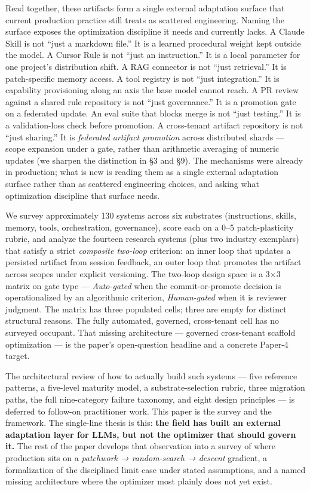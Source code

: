 \documentclass[
]{article}
\begin{document}
Read together, these artifacts form a single external adaptation surface
that current production practice still treats as scattered engineering.
Naming the surface exposes the optimization discipline it needs and
currently lacks. A Claude Skill is not ``just a markdown file.'' It is a
learned procedural weight kept outside the model. A Cursor Rule is not
``just an instruction.'' It is a local parameter for one project's
distribution shift. A RAG connector is not ``just retrieval.'' It is
patch-specific memory access. A tool registry is not ``just
integration.'' It is capability provisioning along an axis the base
model cannot reach. A PR review against a shared rule repository is not
``just governance.'' It is a promotion gate on a federated update. An
eval suite that blocks merge is not ``just testing.'' It is a
validation-loss check before promotion. A cross-tenant artifact
repository is not ``just sharing.'' It is \emph{federated artifact
promotion} across distributed shards --- scope expansion under a gate,
rather than arithmetic averaging of numeric updates (we sharpen the
distinction in §3 and §9). The mechanisms were already in production;
what is new is reading them as a single external adaptation surface
rather than as scattered engineering choices, and asking what
optimization discipline that surface needs.

We survey approximately 130 systems across six substrates (instructions,
skills, memory, tools, orchestration, governance), score each on a 0--5
patch-plasticity rubric, and analyze the fourteen research systems (plus
two industry exemplars) that satisfy a strict \emph{composite two-loop}
criterion: an inner loop that updates a persisted artifact from session
feedback, an outer loop that promotes the artifact across scopes under
explicit versioning. The two-loop design space is a 3×3 matrix on gate
type --- \emph{Auto-gated} when the commit-or-promote decision is
operationalized by an algorithmic criterion, \emph{Human-gated} when it
is reviewer judgment. The matrix has three populated cells; three are
empty for distinct structural reasons. The fully automated, governed,
cross-tenant cell has no surveyed occupant. That missing architecture
--- governed cross-tenant scaffold optimization --- is the paper's
open-question headline and a concrete Paper-4 target.

The architectural review of how to actually build such systems --- five
reference patterns, a five-level maturity model, a substrate-selection
rubric, three migration paths, the full nine-category failure taxonomy,
and eight design principles --- is deferred to follow-on practitioner
work. This paper is the survey and the framework. The single-line thesis
is this: \textbf{the field has built an external adaptation layer for
LLMs, but not the optimizer that should govern it.} The rest of the
paper develops that observation into a survey of where production sits
on a \emph{patchwork → random-search → descent} gradient, a
formalization of the disciplined limit case under stated assumptions,
and a named missing architecture where the optimizer most plainly does
not yet exist.
\end{document}
